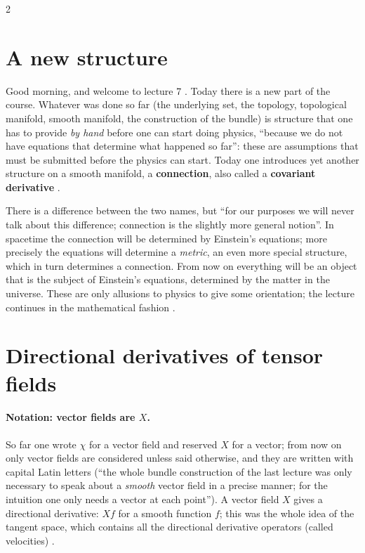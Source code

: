 \begin{paracol}{2}
\section{A new structure}\label{sec:c07-new}

Good morning, and welcome to lecture 7 . Today there is a new part of the course. Whatever was done so far (the underlying set, the topology, topological manifold, smooth manifold, the construction of the bundle) is structure that one has to provide \emph{by hand} before one can start doing physics, ``because we do not have equations that determine what happened so far'': these are assumptions that must be submitted before the physics can start.
Today one introduces yet another structure on a smooth manifold, a \textbf{connection}, also called a \textbf{covariant derivative} .

There is a difference between the two names, but ``for our purposes we will never talk about this difference; connection is the slightly more general notion''. In spacetime the connection will be determined by Einstein's equations; more precisely the equations will determine a \emph{metric}, an even more special structure, which in turn determines a connection. From now on everything will be an object that is the subject of Einstein's equations, determined by the matter in the universe. These are only allusions to physics to give some orientation; the lecture continues in the mathematical fashion
.

\section{Directional derivatives of tensor fields}\label{sec:c07-directional}

\paragraph{Notation: vector fields are $X$.} So far one wrote $\chi$ for a vector field and reserved $X$ for a vector; from now on only vector fields are considered unless said otherwise, and they are written with capital Latin letters (``the whole bundle construction of the last lecture was only necessary to speak about a \emph{smooth} vector field in a precise manner; for the intuition one only needs a vector at each point'').
A vector field $X$ gives a directional derivative: $Xf$ for a smooth function $f$; this was the whole idea of the tangent space, which contains all the directional derivative operators (called velocities)
.


\end{paracol}
